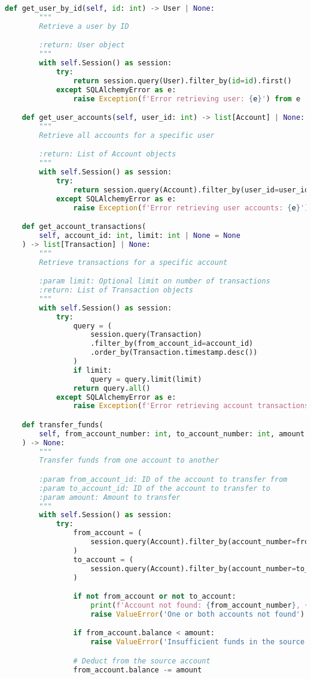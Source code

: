 \begin{lstlisting}[language=Python]
	def get_user_by_id(self, id: int) -> User | None:
		"""
		Retrieve a user by ID

		:return: User object
		"""
		with self.Session() as session:
			try:
				return session.query(User).filter_by(id=id).first()
			except SQLAlchemyError as e:
				raise Exception(f'Error retrieving user: {e}') from e

	def get_user_accounts(self, user_id: int) -> list[Account] | None:
		"""
		Retrieve all accounts for a specific user

		:return: List of Account objects
		"""
		with self.Session() as session:
			try:
				return session.query(Account).filter_by(user_id=user_id).all()
			except SQLAlchemyError as e:
				raise Exception(f'Error retrieving user accounts: {e}') from e

	def get_account_transactions(
		self, account_id: int, limit: int | None = None
	) -> list[Transaction] | None:
		"""
		Retrieve transactions for a specific account

		:param limit: Optional limit on number of transactions
		:return: List of Transaction objects
		"""
		with self.Session() as session:
			try:
				query = (
					session.query(Transaction)
					.filter_by(from_account_id=account_id)
					.order_by(Transaction.timestamp.desc())
				)
				if limit:
					query = query.limit(limit)
				return query.all()
			except SQLAlchemyError as e:
				raise Exception(f'Error retrieving account transactions: {e}') from e

	def transfer_funds(
		self, from_account_number: int, to_account_number: int, amount: float
	) -> None:
		"""
		Transfer funds from one account to another

		:param from_account_id: ID of the account to transfer from
		:param to_account_id: ID of the account to transfer to
		:param amount: Amount to transfer
		"""
		with self.Session() as session:
			try:
				from_account = (
					session.query(Account).filter_by(account_number=from_account_number).first()
				)
				to_account = (
					session.query(Account).filter_by(account_number=to_account_number).first()
				)

				if not from_account or not to_account:
					print(f'Account not found: {from_account_number}, {to_account_number}')
					raise ValueError('One or both accounts not found')

				if from_account.balance < amount:
					raise ValueError('Insufficient funds in the source account')

				# Deduct from the source account
				from_account.balance -= amount


\end{lstlisting}
